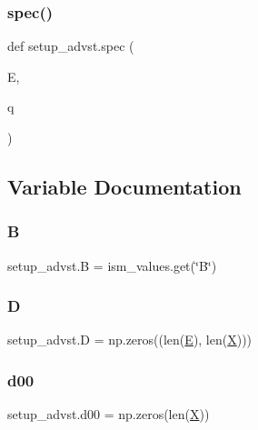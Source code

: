 \mbox{\label{namespacesetup__advst_a6338d51baec2fdf3b904fa36fd169e5d}} 
\subsubsection{\texorpdfstring{spec()}{spec()}}
{\footnotesize\ttfamily def setup\+\_\+advst.\+spec (\begin{DoxyParamCaption}\item[{}]{E,  }\item[{}]{q }\end{DoxyParamCaption})}



\subsection{Variable Documentation}
\mbox{\label{namespacesetup__advst_ac57ac3969c7f3e561eb210c0c6801240}} 
\subsubsection{\texorpdfstring{B}{B}}
{\footnotesize\ttfamily setup\+\_\+advst.\+B = ism\+\_\+values.\+get(\char`\"{}B\char`\"{})}

\mbox{\label{namespacesetup__advst_a1e2106c601eb3d8231ad35e084bf4a36}} 
\subsubsection{\texorpdfstring{D}{D}}
{\footnotesize\ttfamily setup\+\_\+advst.\+D = np.\+zeros((len(\hyperlink{namespacesetup__advst_a846b33b3abeae0f60876a6d51bb0ae79}{E}), len(\hyperlink{namespacesetup__advst_a4fe22219bfc7363b6decb33a0885e17a}{X})))}

\mbox{\label{namespacesetup__advst_a1e1bf78533bf568c76a179bd60ecc7e7}} 
\subsubsection{\texorpdfstring{d00}{d00}}
{\footnotesize\ttfamily setup\+\_\+advst.\+d00 = np.\+zeros(len(\hyperlink{namespacesetup__advst_a4fe22219bfc7363b6decb33a0885e17a}{X}))}



